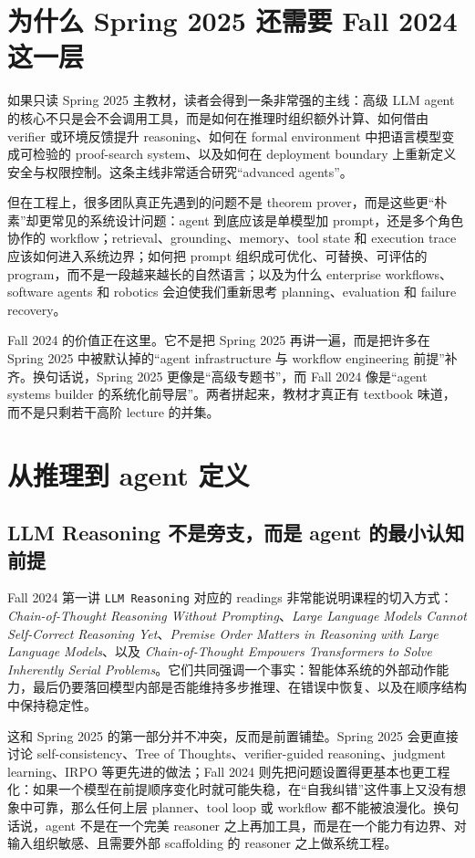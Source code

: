 \section{为什么 Spring 2025 还需要 Fall 2024 这一层}

如果只读 Spring 2025 主教材，读者会得到一条非常强的主线：高级 LLM agent 的核心不只是会不会调用工具，而是如何在推理时组织额外计算、如何借由 verifier 或环境反馈提升 reasoning、如何在 formal environment 中把语言模型变成可检验的 proof-search system、以及如何在 deployment boundary 上重新定义安全与权限控制。这条主线非常适合研究“advanced agents”。

但在工程上，很多团队真正先遇到的问题不是 theorem prover，而是这些更“朴素”却更常见的系统设计问题：agent 到底应该是单模型加 prompt，还是多个角色协作的 workflow；retrieval、grounding、memory、tool state 和 execution trace 应该如何进入系统边界；如何把 prompt 组织成可优化、可替换、可评估的 program，而不是一段越来越长的自然语言；以及为什么 enterprise workflows、software agents 和 robotics 会迫使我们重新思考 planning、evaluation 和 failure recovery。

Fall 2024 的价值正在这里。它不是把 Spring 2025 再讲一遍，而是把许多在 Spring 2025 中被默认掉的“agent infrastructure 与 workflow engineering 前提”补齐。换句话说，Spring 2025 更像是“高级专题书”，而 Fall 2024 像是“agent systems builder 的系统化前导层”。两者拼起来，教材才真正有 textbook 味道，而不是只剩若干高阶 lecture 的并集。

\section{从推理到 agent 定义}

\subsection{LLM Reasoning 不是旁支，而是 agent 的最小认知前提}

Fall 2024 第一讲 \texttt{LLM Reasoning} 对应的 readings 非常能说明课程的切入方式：\textit{Chain-of-Thought Reasoning Without Prompting}、\textit{Large Language Models Cannot Self-Correct Reasoning Yet}、\textit{Premise Order Matters in Reasoning with Large Language Models}、以及 \textit{Chain-of-Thought Empowers Transformers to Solve Inherently Serial Problems}。它们共同强调一个事实：智能体系统的外部动作能力，最后仍要落回模型内部是否能维持多步推理、在错误中恢复、以及在顺序结构中保持稳定性。

这和 Spring 2025 的第一部分并不冲突，反而是前置铺垫。Spring 2025 会更直接讨论 self-consistency、Tree of Thoughts、verifier-guided reasoning、judgment learning、IRPO 等更先进的做法；Fall 2024 则先把问题设置得更基本也更工程化：如果一个模型在前提顺序变化时就可能失稳，在“自我纠错”这件事上又没有想象中可靠，那么任何上层 planner、tool loop 或 workflow 都不能被浪漫化。换句话说，agent 不是在一个完美 reasoner 之上再加工具，而是在一个能力有边界、对输入组织敏感、且需要外部 scaffolding 的 reasoner 之上做系统工程。

